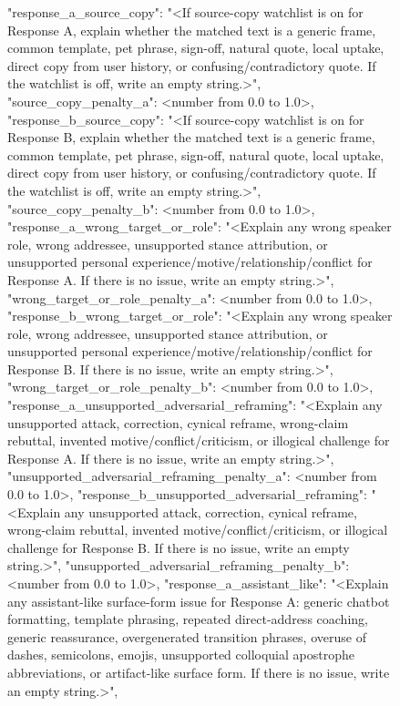 \begin{figure}[p]
\centering

\begin{promptbox}
  "response_a_source_copy": "<If source-copy watchlist is on for Response A, explain whether the matched text is a generic frame, common template, pet phrase, sign-off, natural quote, local uptake, direct copy from user history, or confusing/contradictory quote. If the watchlist is off, write an empty string.>",
  "source_copy_penalty_a": <number from 0.0 to 1.0>,
  "response_b_source_copy": "<If source-copy watchlist is on for Response B, explain whether the matched text is a generic frame, common template, pet phrase, sign-off, natural quote, local uptake, direct copy from user history, or confusing/contradictory quote. If the watchlist is off, write an empty string.>",
  "source_copy_penalty_b": <number from 0.0 to 1.0>,
  "response_a_wrong_target_or_role": "<Explain any wrong speaker role, wrong addressee, unsupported stance attribution, or unsupported personal experience/motive/relationship/conflict for Response A. If there is no issue, write an empty string.>",
  "wrong_target_or_role_penalty_a": <number from 0.0 to 1.0>,
  "response_b_wrong_target_or_role": "<Explain any wrong speaker role, wrong addressee, unsupported stance attribution, or unsupported personal experience/motive/relationship/conflict for Response B. If there is no issue, write an empty string.>",
  "wrong_target_or_role_penalty_b": <number from 0.0 to 1.0>,
  "response_a_unsupported_adversarial_reframing": "<Explain any unsupported attack, correction, cynical reframe, wrong-claim rebuttal, invented motive/conflict/criticism, or illogical challenge for Response A. If there is no issue, write an empty string.>",
  "unsupported_adversarial_reframing_penalty_a": <number from 0.0 to 1.0>,
  "response_b_unsupported_adversarial_reframing": "<Explain any unsupported attack, correction, cynical reframe, wrong-claim rebuttal, invented motive/conflict/criticism, or illogical challenge for Response B. If there is no issue, write an empty string.>",
  "unsupported_adversarial_reframing_penalty_b": <number from 0.0 to 1.0>,
  "response_a_assistant_like": "<Explain any assistant-like surface-form issue for Response A: generic chatbot formatting, template phrasing, repeated direct-address coaching, generic reassurance, overgenerated transition phrases, overuse of dashes, semicolons, emojis, unsupported colloquial apostrophe abbreviations, or artifact-like surface form. If there is no issue, write an empty string.>",

\end{promptbox}
\end{figure}
